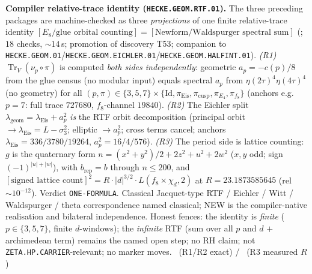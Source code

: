\par\smallskip\noindent\textbf{Compiler relative-trace identity
(\texttt{HECKE.GEOM.RTF.01}).}
The three preceding packages are machine-checked as three \emph{projections} of one finite
relative-trace identity
$[\text{$E_8$/glue orbital counting}]=[\text{Newform/Waldspurger spectral sum}]$
(; $18$ checks, $\sim14$\,s; promotion of discovery
T53; companion to \texttt{HECKE.GEOM.01}/\allowbreak\texttt{HECKE.GEOM.EICHLER.01}/\allowbreak\texttt{HECKE.GEOM.HALFINT.01}).
\emph{(R1)} $\operatorname{Tr}_V(\nu_p\circ\pi)$ is computed \emph{both sides independently}:
geometric $a_p=-c(p)/8$ from the glue census (no modular input) equals spectral $a_p$ from
$\eta(2\tau)^4\eta(4\tau)^4$ (no geometry) for all
$(p,\pi)\in\{3,5,7\}\times\{\mathrm{Id},\pi_{\mathrm{Eis}},\pi_{\mathrm{cusp}},\pi_{E_4},\pi_{f_8}\}$
(anchors e.g.\ $p{=}7$: full trace $727680$, $f_8$-channel $19840$).
\emph{(R2)} The Eichler split $\lambda_{\mathrm{geom}}=\lambda_{\mathrm{Eis}}+a_p^2$
\emph{is} the RTF orbit decomposition (principal orbit $\to\lambda_{\mathrm{Eis}}=L-\sigma_3^2$;
elliptic $\to a_p^2$; cross terms cancel; anchors
$\lambda_{\mathrm{Eis}}=336/3780/19264$, $a_p^2=16/4/576$).
\emph{(R3)} The period side is lattice counting: $g$ is the quaternary form
$n=(x^2+y^2)/2+2z^2+u^2+2w^2$ ($x,y$ odd; sign $(-1)^{|u|+|w|}$), with
$b_{\mathrm{rep}}=b$ through $n\le200$, and
$[\text{signed lattice count}]^2=R\cdot|d|^{3/2}\cdot L(f_8\times\chi_d,2)$ at
$R=23.1873585645$ (rel~$\sim10^{-12}$). Verdict \texttt{ONE-FORMULA}.
Classical Jacquet-type RTF / Eichler / Witt / Waldspurger / theta correspondence named
classical; NEW is the compiler-native realisation and bilateral independence.
Honest fences: the identity is \emph{finite} ($p\in\{3,5,7\}$, finite $d$-windows); the
\emph{infinite} RTF (sum over all $p$ and $d$ $+$ archimedean term) remains the named open
step; no RH claim; not \texttt{ZETA.HP.CARRIER}-relevant; no marker moves.
\mE\ (R1/R2 exact) / \mC\ (R3 measured $R$)



